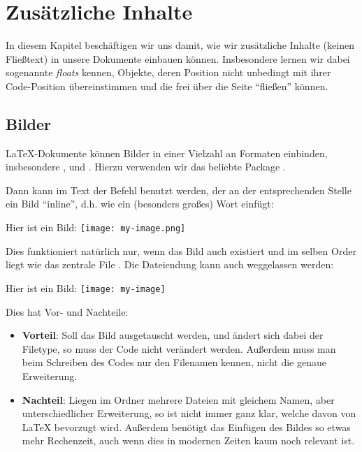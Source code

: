 \chapter{Zusätzliche Inhalte}
In diesem Kapitel beschäftigen wir uns damit, wie wir zusätzliche Inhalte (keinen Fließtext) in unsere Dokumente einbauen können.
Insbesondere lernen wir dabei sogenannte \emph{floats} kennen, Objekte, deren Position nicht unbedingt mit ihrer Code-Position übereinstimmen und die frei über die Seite \enquote{fließen} können.

\section{Bilder}\label{sec:bilder}
\LaTeX -Dokumente können Bilder in einer Vielzahl an Formaten einbinden, insbesondere ,  und .
Hierzu verwenden wir das beliebte Package .
\begin{latexlisting}
	\usepackage{graphicx}
\end{latexlisting}
Dann kann im Text der Befehl  benutzt werden, der an der entsprechenden Stelle ein Bild \enquote{inline}, d.h. wie ein (besonders großes) Wort einfügt:
\begin{latexlisting}
	Hier ist ein Bild:
	\texttt{[image: my-image.png]}
\end{latexlisting}
Dies funktioniert natürlich nur, wenn das Bild  auch existiert und im selben Order liegt wie das zentrale File .
Die Dateiendung  kann auch weggelassen werden:
\begin{latexlisting}
	Hier ist ein Bild:
	\texttt{[image: my-image]}
\end{latexlisting}
Dies hat Vor- und Nachteile:
\begin{itemize}
	\item \textbf{Vorteil}: Soll das Bild ausgetauscht werden, und ändert sich dabei der Filetype, so muss der Code nicht verändert werden.
	Außerdem muss man beim Schreiben des Codes nur den Filenamen kennen, nicht die genaue Erweiterung.
	\item \textbf{Nachteil}: Liegen im Ordner mehrere Dateien mit gleichem Namen, aber unterschiedlicher Erweiterung, so ist nicht immer ganz klar, welche davon von \LaTeX{} bevorzugt wird.
	Außerdem benötigt das Einfügen des Bildes so etwas mehr Rechenzeit, auch wenn dies in modernen Zeiten kaum noch relevant ist.
\end{itemize}
